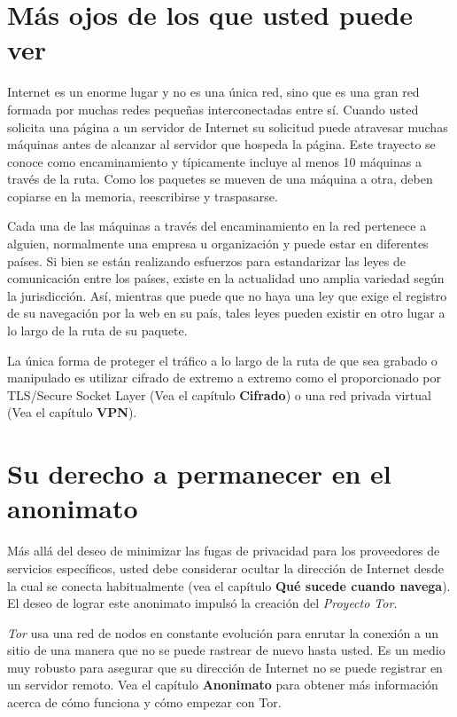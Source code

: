\documentclass[10pt,a5paper,twoside,,]{book}
\begin{document}
\section{Más ojos de los que usted puede
ver}\label{muxe1s-ojos-de-los-que-usted-puede-ver}

Internet es un enorme lugar y no es una única red, sino que es una gran
red formada por muchas redes pequeñas interconectadas entre sí. Cuando
usted solicita una página a un servidor de Internet su solicitud puede
atravesar muchas máquinas antes de alcanzar al servidor que hospeda la
página. Este trayecto se conoce como encaminamiento y típicamente
incluye al menos 10 máquinas a través de la ruta. Como los paquetes se
mueven de una máquina a otra, deben copiarse en la memoria, reescribirse
y traspasarse.

Cada una de las máquinas a través del encaminamiento en la red pertenece
a alguien, normalmente una empresa u organización y puede estar en
diferentes países. Si bien se están realizando esfuerzos para
estandarizar las leyes de comunicación entre los países, existe en la
actualidad uno amplia variedad según la jurisdicción. Así, mientras que
puede que no haya una ley que exige el registro de su navegación por la
web en su país, tales leyes pueden existir en otro lugar a lo largo de
la ruta de su paquete.

La única forma de proteger el tráfico a lo largo de la ruta de que sea
grabado o manipulado es utilizar cifrado de extremo a extremo como el
proporcionado por TLS/Secure Socket Layer (Vea el capítulo
\textbf{Cifrado}) o una red privada virtual (Vea el capítulo
\textbf{VPN}).

\section{Su derecho a permanecer en el
anonimato}\label{su-derecho-a-permanecer-en-el-anonimato}

Más allá del deseo de minimizar las fugas de privacidad para los
proveedores de servicios específicos, usted debe considerar ocultar la
dirección de Internet desde la cual se conecta habitualmente (vea el
capítulo \textbf{Qué sucede cuando navega}). El deseo de lograr este
anonimato impulsó la creación del \emph{Proyecto Tor}.

\emph{Tor} usa una red de nodos en constante evolución para enrutar la
conexión a un sitio de una manera que no se puede rastrear de nuevo
hasta usted. Es un medio muy robusto para asegurar que su dirección de
Internet no se puede registrar en un servidor remoto. Vea el capítulo
\textbf{Anonimato} para obtener más información acerca de cómo funciona
y cómo empezar con Tor.
\end{document}
